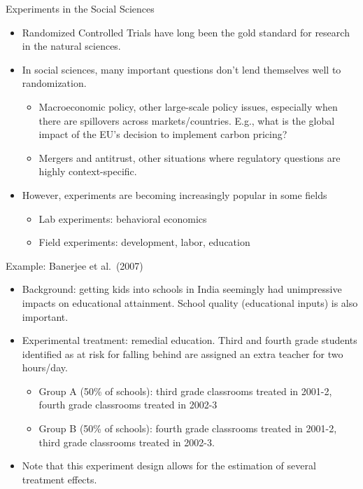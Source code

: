 \documentclass[aspectratio=169,11pt]{beamer}
\begin{document}
\begin{frame}{Experiments in the Social Sciences}
\begin{itemize}
  \item Randomized Controlled Trials have long been the gold standard for research
  in the natural sciences.

  \smallskip
  \item In social sciences, many important questions don't lend themselves well
  to randomization.
  \begin{itemize}
    \item Macroeconomic policy, other large-scale policy issues, especially
    when there are spillovers across markets/countries. E.g., what is the global
    impact of the EU's decision to implement carbon pricing?
    \item Mergers and antitrust, other situations where regulatory questions are highly
     context-specific.
  \end{itemize}

  \smallskip
  \item However, experiments are becoming increasingly popular in some fields
  \begin{itemize}
    \item Lab experiments: behavioral economics
    \item Field experiments: development, labor, education
  \end{itemize}

\end{itemize}
\end{frame}



\begin{frame}{Example: Banerjee et al.\ (2007)}
\begin{itemize}
  \item Background: getting kids into schools in India seemingly had
  unimpressive impacts on educational attainment. School quality
  (educational inputs) is also important.

  \smallskip
  \item Experimental treatment: remedial education. Third and fourth
  grade students identified as at risk for falling behind are assigned
  an extra teacher for two hours/day.
  \begin{itemize}
    \item Group A (50\% of schools): third grade classrooms treated
    in 2001-2, fourth grade classrooms treated in 2002-3
    \item Group B (50\% of schools): fourth grade classrooms
    treated in 2001-2, third grade classrooms treated in 2002-3.

\end{itemize}
  \item Note that this experiment design allows for the estimation of several
  treatment effects. 

\end{itemize}
\end{frame}
\end{document}
